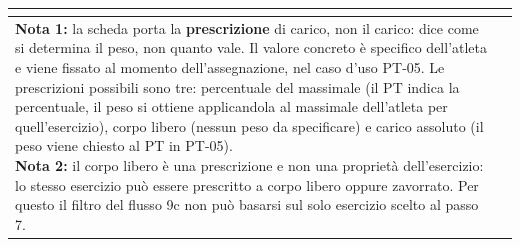 \documentclass[../../../../SoftwareRequirementsSpecification.tex]{subfiles}
\begin{document}
\begin{tabularx}{\textwidth}{|l|X|}
{  } \\ \hline
  \ucnote{
    \textbf{Nota 1:} la scheda porta la \textbf{prescrizione} di
    carico, non il carico: dice come si determina il peso, non quanto
    vale. Il valore concreto è specifico dell'atleta e viene fissato
    al momento dell'assegnazione, nel caso d'uso PT-05. Le
    prescrizioni possibili sono tre: percentuale del massimale
    (il PT indica la percentuale, il peso si ottiene applicandola al
    massimale dell'atleta per quell'esercizio), corpo libero
    (nessun peso da specificare) e carico assoluto (il peso viene
    chiesto al PT in PT-05).\newline
    \textbf{Nota 2:} il corpo libero è una prescrizione e non una
    proprietà dell'esercizio: lo stesso esercizio può essere
    prescritto a corpo libero oppure zavorrato. Per questo il filtro
    del flusso 9c non può basarsi sul solo esercizio scelto al
    passo 7.
  } \\ \hline
\end{tabularx}
\end{document}
